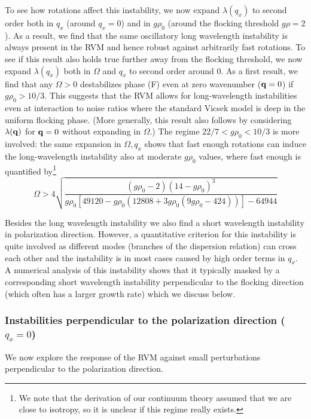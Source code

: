 \documentclass[aps,twocolumn,showlabels,showrefs,amsmath,amssymb,pre,superscriptaddress, floatfix, colors]{revtex4}
\newcommand{\1}{\begin{equation}}
\newcommand{\2}{\end{equation}}
\newcommand{\4}[2]{{\frac{#1}{#2}}}
\begin{document}
To see how rotations affect this instability, we now expand
$\lambda(q_x)$ to second order both in $q_x$ (around $q_x=0$) and in $g \rho_0$ (around the flocking threshold $g\rho=2$). 
As a result, we find that the same oscillatory long wavelength instability is always present in the RVM and hence robust against arbitrarily fast rotations. 
To see if this result also holds true further away from the flocking threshold, we now expand $\lambda(q_x)$
both in $\Omega$ and $q_x$ to second order around 0. 
As a first result, we find that any $\Omega>0$ destabilizes phase (F) even at zero wavenumber (${\bf q}=0$) if $g\rho_0>10/3$.
This suggests that the RVM allows for long-wavelength instabilities even at interaction to noise ratios where the standard Vicsek model is deep in the uniform flocking phase. 
(More generally, this result also follows by considering $\lambda({\bf q})$ for ${\bf q}=0$ without expanding in $\Omega$.)
The regime $22/7<g\rho_0<10/3$ is more involved: the same expansion in $\Omega,q_x$ shows that fast enough rotations can induce the 
long-wavelength instability also at moderate $g\rho_0$ values, where fast enough is quantified by\footnote{We note that the derivation of our 
continuum theory assumed that we are close to isotropy, so it is unclear if this regime really exists.}
\1 \Omega> 4 \sqrt{\4{(g\rho_0-2)(14-g\rho_0)^3}{g\rho_0 \left[49120-g\rho_0(12808 + 3g\rho_0(9g\rho_0-424) ) \right] -64944}}\2


Besides the long wavelength instability we also find a short wavelength instability in polarization direction.
However, a quantitative criterion for this instability is quite involved as different modes 
(branches of the dispersion relation) can cross each other and the instability 
is in most cases caused by high order terms in $q_x$.
A numerical analysis of this instability shows that it typically masked by a corresponding short wavelength 
instability perpendicular to the flocking direction (which often has a larger growth rate) which we discuss below. 



\subsubsection{Instabilities perpendicular to the polarization direction ($q_x=0$)}
We now explore the response of the RVM against small perturbations perpendicular to the polarization direction. 
\end{document}
